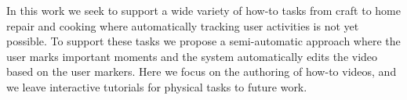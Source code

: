 In this work we seek to support a wide variety of how-to tasks from craft to home repair and cooking where automatically tracking user activities is not yet possible. To support these tasks we propose a semi-automatic approach where the user marks important moments and the system automatically edits the video based on the user markers. Here we focus on the authoring of how-to videos, and we leave interactive tutorials for physical tasks to future work.




